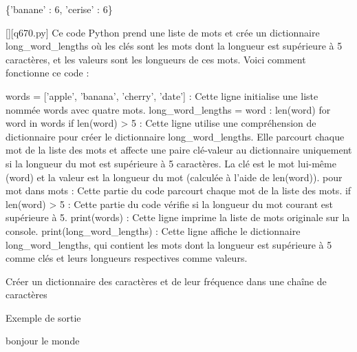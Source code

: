 \{'banane' : 6, 'cerise' : 6\}
        \par
        \begin{solution}
            \renewcommand{\nomfichier}{q670.py}
            \pythonfile{\chemincode \nomfichier}[][\nomfichier]
            Ce code Python prend une liste de mots et crée un dictionnaire long_word_lengths où les clés sont les mots dont la longueur est supérieure à 5 caractères, et les valeurs sont les longueurs de ces mots. Voici comment fonctionne ce code :

    words = ['apple', 'banana', 'cherry', 'date'] : Cette ligne initialise une liste nommée words avec quatre mots.
    long_word_lengths = {word : len(word) for word in words if len(word) > 5} : Cette ligne utilise une compréhension de dictionnaire pour créer le dictionnaire long_word_lengths. Elle parcourt chaque mot de la liste des mots et affecte une paire clé-valeur au dictionnaire uniquement si la longueur du mot est supérieure à 5 caractères. La clé est le mot lui-même (word) et la valeur est la longueur du mot (calculée à l'aide de len(word)).
        pour mot dans mots : Cette partie du code parcourt chaque mot de la liste des mots.
        if len(word) > 5 : Cette partie du code vérifie si la longueur du mot courant est supérieure à 5.
    print(words) : Cette ligne imprime la liste de mots originale sur la console.
    print(long_word_lengths) : Cette ligne affiche le dictionnaire long_word_lengths, qui contient les mots dont la longueur est supérieure à 5 comme clés et leurs longueurs respectives comme valeurs.
        \end{solution}
        

        \question
        Créer un dictionnaire des caractères et de leur fréquence dans une chaîne de caractères

Exemple de sortie

bonjour le monde

